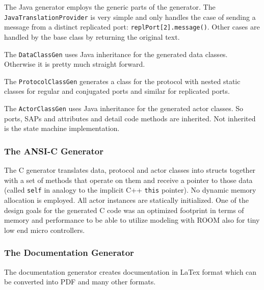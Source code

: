 The Java generator employs the generic parts of the generator. The \texttt{JavaTranslationProvider} is very simple and only handles the case of sending a message from a distinct replicated port: \texttt{replPort[2].message()}. Other cases are handled by the base class by returning the original text.

The \texttt{DataClassGen} uses Java inheritance for the generated data classes. Otherwise it is pretty much straight forward.

The \texttt{ProtocolClassGen} generates a class for the protocol with nested static classes for regular and conjugated ports and similar for replicated ports.

The \texttt{ActorClassGen} uses Java inheritance for the generated actor classes. So ports, SAPs and attributes and detail code methods are inherited. Not inherited is the state machine implementation.

\subsubsection{The ANSI-C Generator}

The C generator translates data, protocol and actor classes into structs together with a set of methods that operate on them and receive a pointer to those data (called \texttt{self} in analogy to the implicit C++ \texttt{this} pointer).
No dynamic memory allocation is employed. All actor instances are statically initialized.
One of the design goals for the generated C code was an optimized footprint in terms of memory and performance to be able to utilize modeling with ROOM also for tiny low end micro controllers.

\subsubsection{The Documentation Generator}

The documentation generator creates documentation in LaTex format which can be converted into PDF and many other formats.

